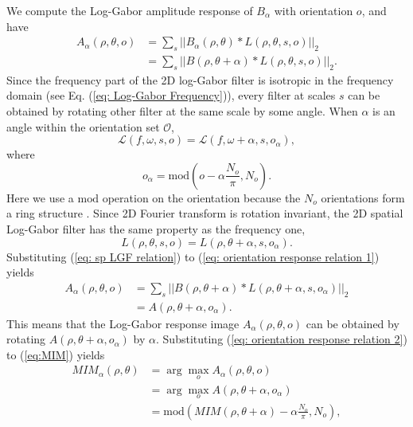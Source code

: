 \documentclass[letterpaper, 10 pt, journal, twoside]{IEEEtran}
\begin{document}
We compute the Log-Gabor amplitude response of $B_\alpha$ with orientation $o$, and have 
\begin{equation}
        \label{eq: orientation response relation 1}
        \begin{aligned} 
        A_{\alpha}(\rho,\theta,o) 
        &=\sum_s ||B_\alpha(\rho,\theta)* L(\rho,\theta,s,o)||_2 \\
        & =\sum_s ||B(\rho,\theta+\alpha)* L(\rho,\theta,s,o)||_2.
        \end{aligned}
\end{equation}
Since the frequency part of the 2D log-Gabor filter is isotropic in the frequency domain (see Eq. (\ref{eq: Log-Gabor Frequency})), every filter at scales $s$ can be obtained by rotating other filter at the same scale by some angle. When $\alpha$ is an angle within the orientation set $\mathcal{O}$,
\begin{equation}
        \label{eq: sp LGF relation freqeuncy}
        \mathcal{L}(f,\omega,s,o) = \mathcal{L}(f,\omega+\alpha,s,o_\alpha),
\end{equation}
where 
{\begin{equation}
o_\alpha=\mathrm{mod}(o-\alpha\frac{N_o}{\pi},N_o). 
\end{equation}}
Here we use a $\mathrm{mod}$ operation on the orientation because the $N_o$ orientations form a ring structure \cite{li2019rift}. Since 2D Fourier transform is rotation invariant, the 2D spatial Log-Gabor filter has the same property as the frequency one, 
\begin{equation}
        \label{eq: sp LGF relation}
        L(\rho,\theta,s,o) = L(\rho,\theta+\alpha,s,o_\alpha).
\end{equation}
Substituting (\ref{eq: sp LGF relation}) to (\ref{eq: orientation response relation 1}) yields
\begin{equation}
        \label{eq: orientation response relation 2}
        \begin{aligned} 
        A_{\alpha}(\rho,\theta,o) 
        &=\sum_s ||B(\rho,\theta+\alpha)*L(\rho,\theta+\alpha,s,o_\alpha)||_2\\
        &=A(\rho,\theta+\alpha,o_\alpha).
        \end{aligned}
\end{equation}
This means that the Log-Gabor response image $A_{\alpha}(\rho,\theta,o)$ can be obtained by rotating $A(\rho,\theta+\alpha,o_\alpha)$ by $\alpha$. Substituting (\ref{eq: orientation response relation 2}) to  (\ref{eq:MIM}) yields
\begin{equation}
        \label{eq: MIM relation}
        \begin{aligned}
        MIM_\alpha(\rho,\theta)
        &=\arg\max_o A_\alpha(\rho,\theta,o)  \\
        &=\arg\max_o A(\rho,\theta+\alpha,o_\alpha) \\ 
        &=\mathrm{mod} (MIM(\rho,\theta+\alpha)-\alpha\frac{N_o}{\pi}, N_o),
        \end{aligned}
\end{equation}
\end{document}
